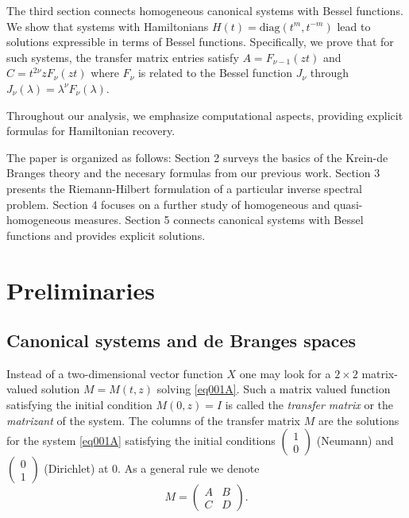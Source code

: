 \documentclass[11pt,twoside,reqno]{amsart}
\def\C{{\mathbb{C}}}
\theoremstyle{plain}
\numberwithin{equation}{section}
\begin{document}
The third section connects homogeneous canonical systems with Bessel functions. We show that systems with Hamiltonians $H(t) = \text{diag}(t^m, t^{-m})$ lead to solutions expressible in terms of Bessel functions. Specifically, we prove that for such systems, the transfer matrix entries satisfy $A = F_{\nu-1}(zt)$ and $C = t^{2\nu} z F_\nu(zt)$ where $F_\nu$ is related to the Bessel function $J_\nu$ through $J_\nu(\lambda) = \lambda^\nu F_\nu(\lambda)$.

Throughout our analysis, we emphasize computational aspects, providing explicit formulas for Hamiltonian recovery. 



The paper is organized as follows: Section 2 surveys the basics of the Krein-de Branges theory and the necesary formulas from our previous work. Section 3 presents the Riemann-Hilbert formulation of a particular  inverse spectral problem. Section 4 focuses on a further study of homogeneous and quasi-homogeneous measures. Section 5 connects canonical systems with Bessel functions and provides explicit solutions. 



\section{Preliminaries}

\subsection{Canonical systems and de Branges spaces} Instead of a two-dimensional vector function $X$ one may look for a $2\times 2$ matrix-valued solution
$M=M(t,z)$ solving \eqref{eq001A}. Such a matrix valued function satisfying the initial condition  
$M(0,z)=I$ is called the \textit{transfer matrix} or the \textit{matrizant} of the system. The columns of the transfer matrix $M$ are the solutions for the system \eqref{eq001A} satisfying the initial conditions $\begin{pmatrix}1\\0\end{pmatrix}$ (Neumann) and $\begin{pmatrix}0\\1\end{pmatrix}$ (Dirichlet) at 0.
As a general rule we denote
\begin{equation}M=\begin{pmatrix} A& B\\C&D\end{pmatrix}.\label{eqTM}\end{equation}
\end{document}
